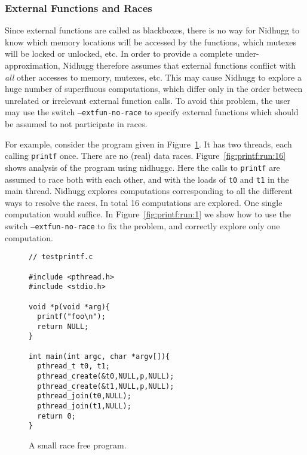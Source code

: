 \documentclass[a4paper]{article}
\begin{document}
\subsubsection{External Functions and Races}\label{sec:stdlibc:races}

Since external functions are called as blackboxes, there is no way for
Nidhugg to know which memory locations will be accessed by the
functions, which mutexes will be locked or unlocked, etc. In order to
provide a complete under-approximation, Nidhugg therefore assumes that
external functions conflict with \emph{all} other accesses to memory,
mutexes, etc.
%
This may cause Nidhugg to explore a huge number of superfluous
computations, which differ only in the order between unrelated or
irrelevant external function calls.
%
To avoid this problem, the user may use the switch
\texttt{--extfun-no-race} to specify external functions which should
be assumed to not participate in races.

For example, consider the program given in
Figure~\ref{fig:printf:prog}. It has two threads, each calling
\texttt{printf} once. There are no (real) data
races. Figure~\ref{fig:printf:run:16} shows analysis of the program
using \textsf{nidhuggc}. Here the calls to \texttt{printf} are assumed
to race both with each other, and with the loads of \texttt{t0} and
\texttt{t1} in the main thread.
%
Nidhugg explores computations corresponding to all the different ways
to resolve the races. In total 16 computations are explored. One
single computation would suffice.
%
In Figure~\ref{fig:printf:run:1} we show how to use the switch
\texttt{--extfun-no-race} to fix the problem, and correctly explore
only one computation.

\begin{figure}
\begin{verbatim}
// testprintf.c

#include <pthread.h>
#include <stdio.h>

void *p(void *arg){
  printf("foo\n");
  return NULL;
}

int main(int argc, char *argv[]){
  pthread_t t0, t1;
  pthread_create(&t0,NULL,p,NULL);
  pthread_create(&t1,NULL,p,NULL);
  pthread_join(t0,NULL);
  pthread_join(t1,NULL);
  return 0;
}
\end{verbatim}
\caption{A small race free program.}\label{fig:printf:prog}
\end{figure}
\end{document}
